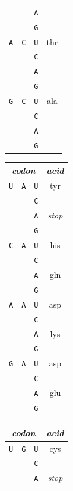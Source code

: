 \documentclass[11pt]{report}
\newcommand{\mybase}[1]{\texttt{#1}\xspace}
\newcommand{\baseA}{\mybase{A}}
\newcommand{\baseC}{\mybase{C}}
\newcommand{\baseG}{\mybase{G}}
\newcommand{\baseU}{\mybase{U}}
\begin{document}
\begin{table}[t!]
\begin{tabular}{|ccc|c|}
    \\ & & \baseA &
    \\ & & \baseG &
    \\ \hline \hline
    \baseA & \baseC & \baseU & thr
    \\ & & \baseC &
    \\ & & \baseA &
    \\ & & \baseG &
    \\ \hline \hline
    \baseG & \baseC & \baseU & ala
    \\ & & \baseC &
    \\ & & \baseA &
    \\ & & \baseG &
    \\ \hline
  \end{tabular}
  \qquad
  \begin{tabular}{|ccc|c|}
    \hline
    \multicolumn{3}{|c|}{\textit{codon}} & \textit{acid}
    \\ \hline \hline
    \baseU & \baseA & \baseU & tyr
    \\ & & \baseC &
    \\ \hline
    &  & \baseA & \textit{stop}
    \\ & & \baseG &
    \\ \hline \hline
    \baseC & \baseA & \baseU & his
    \\ & & \baseC &
    \\ \hline
    &  & \baseA & gln
    \\ & & \baseG &
    \\ \hline \hline
    \baseA & \baseA & \baseU & asp
    \\ & & \baseC &
    \\ \hline
    &  & \baseA & lys
    \\ & & \baseG &
    \\ \hline \hline
    \baseG & \baseA & \baseU & asp
    \\ & & \baseC &
    \\ \hline
    &  & \baseA & glu
    \\ & & \baseG &
    \\ \hline
  \end{tabular}
  \qquad
  \begin{tabular}{|ccc|c|}
    \hline
    \multicolumn{3}{|c|}{\textit{codon}} & \textit{acid}
    \\ \hline \hline
    \baseU & \baseG & \baseU & cys
    \\ & & \baseC &
    \\ \hline
    &  & \baseA & \textit{stop}

\end{tabular}
\end{table}
\end{document}
